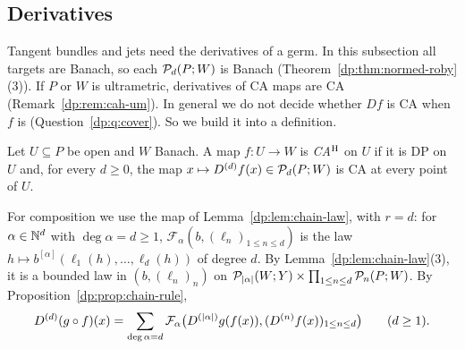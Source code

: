 \subsection{Derivatives}\label{dp:ssec:ca-derivatives}

Tangent bundles and jets need the derivatives of a germ. In this subsection all targets are Banach, so each $\mathcal P_d(P;W)$ is Banach (Theorem~\ref{dp:thm:normed-roby}(3)). If $P$ or $W$ is ultrametric, derivatives of CA maps are CA (Remark~\ref{dp:rem:cah-um}). In general we do not decide whether $Df$ is CA when $f$ is (Question~\ref{dp:q:cover}). So we build it into a definition.

\begin{definition}\label{dp:def:cah}
Let $U\subseteq P$ be open and $W$ Banach. A map $f\colon U\to W$ is \emph{CA$^{\rm H}$} on $U$ if it is DP on $U$ and, for every $d\ge0$, the map $x\mapsto D^{(d)}f(x)\in\mathcal P_d(P;W)$ is CA at every point of $U$.
\end{definition}

For composition we use the map of Lemma~\ref{dp:lem:chain-law}, with $r=d$: for $\alpha\in\mathbb N^d$ with $\deg\alpha=d\ge1$, $\mathcal F_\alpha(b,(\ell_n)_{1\le n\le d})$ is the law $h\mapsto b^{[\alpha]}(\ell_1(h),\dots,\ell_d(h))$ of degree $d$. By Lemma~\ref{dp:lem:chain-law}(3), it is a bounded law in $(b,(\ell_n)_n)$ on $\mathcal P_{\lvert \alpha\rvert}(W;Y)\times\prod_{1\le n\le d}\mathcal P_n(P;W)$. By Proposition~\ref{dp:prop:chain-rule},
\begin{equation}\label{dp:eq:ca-chain}
 D^{(d)}(g\circ f)(x)=\sum_{\deg\alpha=d}\mathcal F_\alpha\bigl(D^{(\lvert \alpha\rvert)}g(f(x)),(D^{(n)}f(x))_{1\le n\le d}\bigr)\qquad(d\ge1).
\end{equation}

